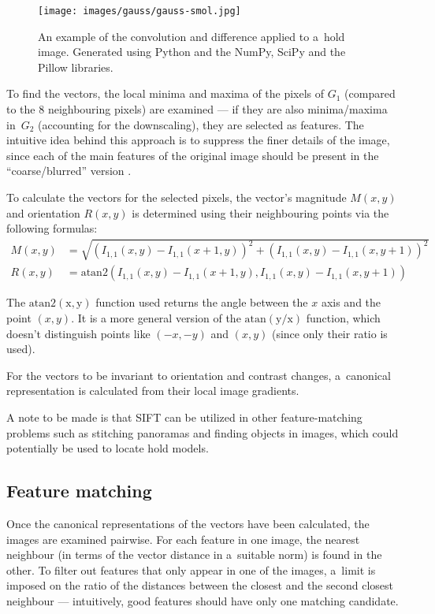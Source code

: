 \begin{figure}
	\centering
	\texttt{[image: images/gauss/gauss-smol.jpg]}
	\caption{An example of the convolution and difference applied to a~hold image. Generated using Python and the NumPy, SciPy and the Pillow libraries.}
	\label{fig:gaussexample}
\end{figure}

To find the vectors, the local minima and maxima of the pixels of $G_1$ (compared to the 8 neighbouring pixels) are examined --- if they are also minima/maxima in~$G_2$ (accounting for the downscaling), they are selected as features.
The intuitive idea behind this approach is to suppress the finer details of the image, since each of the main features of the original image should be present in the ``coarse/blurred'' version \cite{scalespace}.

To calculate the vectors for the selected pixels, the vector's magnitude $M(x,y)$ and orientation $R(x,y)$ is determined using their neighbouring points via the following formulas:
\begin{align}
	M(x,y) &= \sqrt{\left(I_{1,1}(x, y) - I_{1,1}(x + 1, y)\right)^2 + \left(I_{1,1}(x,y) - I_{1,1}(x, y + 1)\right)^2} \\[0.7em]
	R(x,y) &= \mathrm{atan2} \left(I_{1,1}(x, y) - I_{1,1}(x + 1, y), I_{1,1}(x,y) - I_{1,1}(x, y + 1)\right)
\end{align}

The $\mathrm{atan2(x, y)}$ function used returns the angle between the $x$ axis and the point $(x, y)$.
It is a more general version of the $\mathrm{atan(y/x)}$ function, which doesn't distinguish points like $(-x, -y)$ and $(x, y)$ (since only their ratio is used).

For the vectors to be invariant to orientation and contrast changes, a~canonical representation is calculated from their local image gradients.

A note to be made is that SIFT can be utilized in other feature-matching problems such as stitching panoramas and finding objects in images, which could potentially be used to locate hold models.

\subsection{Feature matching}
Once the canonical representations of the vectors have been calculated, the images are examined pairwise.
For each feature in one image, the nearest neighbour (in terms of the vector distance in a~suitable norm) is found in the other.
To filter out features that only appear in one of the images, a~limit is imposed on the ratio of the distances between the closest and the second closest neighbour --- intuitively, good features should have only one matching candidate.

